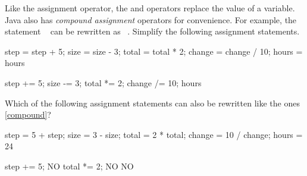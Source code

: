\Q \label{compound} Like the assignment operator, the \java{++} and \java{--} operators replace the value of a variable.
Java also has \emph{compound assignment} operators for convenience.
For example, the statement ~ can be rewritten as ~.
Simplify the following assignment statements.

\vspace{-1ex}
\hspace{2em}
\begin{minipage}[t]{150pt}
\begin{javalst}
step = step + 5;
size = size - 3;
total = total * 2;
change = change / 10;
hours = hours %
\end{javalst}
\end{minipage}
\begin{minipage}[t]{150pt}
\begin{answer}[6em]
\begin{javaans}
step += 5;
size -= 3;
total *= 2;
change /= 10;
hours %
\end{javaans}
\end{answer}
\end{minipage}


\Q Which of the following assignment statements can also be rewritten like the ones \ref{compound}?

\vspace{-1ex}
\hspace{2em}
\begin{minipage}[t]{150pt}
\begin{javalst}
step = 5 + step;
size = 3 - size;
total = 2 * total;
change = 10 / change;
hours = 24 %
\end{javalst}
\end{minipage}
\begin{minipage}[t]{150pt}
\begin{answer}[6em]
\begin{javaans}
step += 5;
NO
total *= 2;
NO
NO
\end{javaans}
\end{answer}
\end{minipage}
